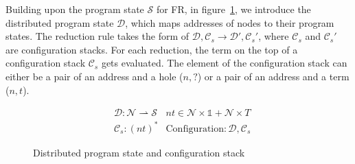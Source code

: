 Building upon the program state $\mathcal{S}$ for FR, in figure~\ref{d-state}, we introduce the distributed program state $\mathcal{D}$, which maps addresses of nodes to their program states. The reduction rule takes the form of $\mathcal{D}, \mathcal{C}_s \longrightarrow \mathcal{D'}, \mathcal{C}_s'$, where $\mathcal{C}_s$ and $\mathcal{C}_s'$ are configuration stacks. For each reduction, the term on the top of a configuration stack $\mathcal{C}_s$ gets evaluated. The element of the configuration stack can either be a pair of an address and a hole ($n, ?$) or a pair of an address and a term ($n, t$).
\begin{figure}
    \begin{align*}
        &\mathcal{D}: \mathcal{N} \rightharpoonup \mathcal{S}
        &\mathit{nt} \in  \mathcal{N} \times\mathds{1} + \mathcal{N}\times T\\
        &\mathcal{C}_s : (nt)^*
        &\mathrm{Configuration}: \mathcal{D}, \mathcal{C}_s
    \end{align*}
    \caption{Distributed program state and configuration stack}
    \label{d-state}
\end{figure}

